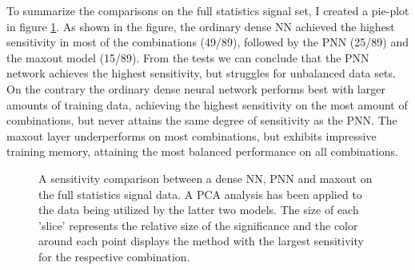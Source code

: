 To summarize the comparisons on the full statistics signal set, I created a pie-plot in figure \ref{fig:FSComp}. As shown in the figure, the ordinary dense \ac{NN}
achieved the highest sensitivity in most of the combinations (49/89), followed by the \ac{PNN} (25/89) and the maxout model (15/89). From the tests we can conclude that 
the \ac{PNN} network achieves the highest sensitivity, but struggles for unbalanced data sets. On the contrary the ordinary dense neural network performs best with larger amounts of 
training data, achieving the highest sensitivity on the most amount of combinations, but never attains the same degree of sensitivity as the \ac{PNN}. The maxout layer underperforms on 
most combinations, but exhibits impressive training memory, attaining the most balanced performance on all combinations.
\begin{figure}
    \caption[A sensitivity comparison between a dense \acs{NN}, \acs{PNN} and maxout on the full statistics 
    signal data. A \acs{PCA} analysis has been applied to the data being utilized by the latter two models.]{
    A sensitivity comparison between a dense \ac{NN}, \ac{PNN} and maxout on the full statistics 
    signal data. A \ac{PCA} analysis has been applied to the data being utilized by the latter two models.
    The size of each 'slice' represents the relative size of the significance and the color around each point 
    displays the method with the largest sensitivity for the respective combination.}
    \label{fig:FSComp}
\end{figure}